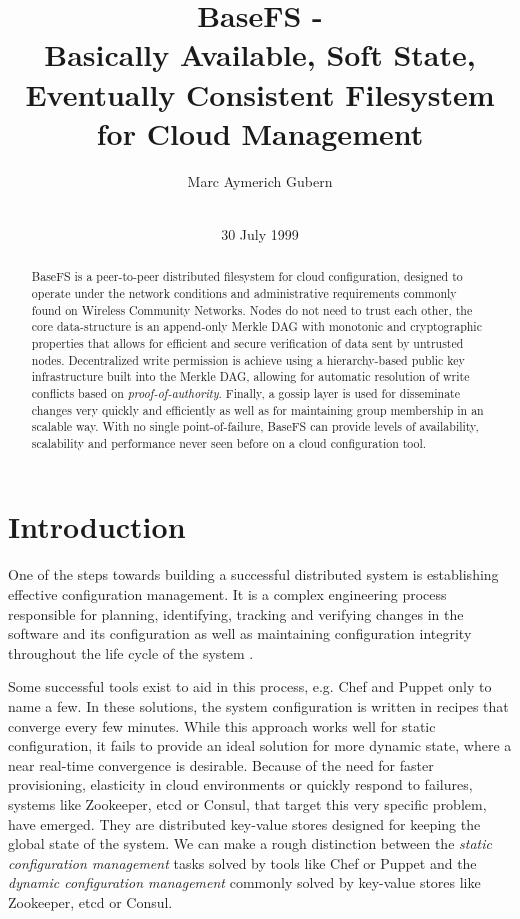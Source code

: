 \documentclass{sig-alternate}
\begin{document}
\title{BaseFS -\\ Basically Available, Soft State, Eventually Consistent Filesystem for Cloud Management}
\author{
\alignauthor
Marc Aymerich Gubern\\
    \\
}
\additionalauthors{}
\date{30 July 1999}

\maketitle

\begin{abstract}
BaseFS is a peer-to-peer distributed filesystem for cloud configuration, designed to operate under the network conditions and administrative requirements commonly found on Wireless Community Networks. Nodes do not need to trust each other, the core data-structure is an append-only Merkle DAG with monotonic and cryptographic properties that allows for efficient and secure verification of data sent by untrusted nodes. Decentralized write permission is achieve using a hierarchy-based public key infrastructure built into the Merkle DAG, allowing for automatic resolution of write conflicts based on \textit{proof-of-authority}. Finally, a gossip layer is used for disseminate changes very quickly and efficiently as well as for maintaining group membership in an scalable way. With no single point-of-failure, BaseFS can provide levels of availability, scalability and performance never seen before on a cloud configuration tool.

\end{abstract}
\section{Introduction}
One of the steps towards building a successful distributed system is establishing effective configuration management. It is a complex engineering process responsible for planning, identifying, tracking and verifying changes in the software and its configuration as well as maintaining configuration integrity throughout the life cycle of the system \cite{Yermolaiev:managing}.

Some successful tools exist to aid in this process, e.g. Chef and Puppet only to name a few. In these solutions, the system configuration is written in recipes that converge every few minutes. While this approach works well for static configuration, it fails to provide an ideal solution for more dynamic state, where a near real-time convergence is desirable. Because of the need for faster provisioning, elasticity in cloud environments or quickly respond to failures, systems like Zookeeper, etcd or Consul, that target this very specific problem, have emerged. They are distributed key-value stores designed for keeping the global state of the system. We can make a rough distinction between the \textit{static configuration management} tasks solved by tools like Chef or Puppet and the \textit{dynamic configuration management} commonly solved by key-value stores like Zookeeper, etcd or Consul.
\end{document}
